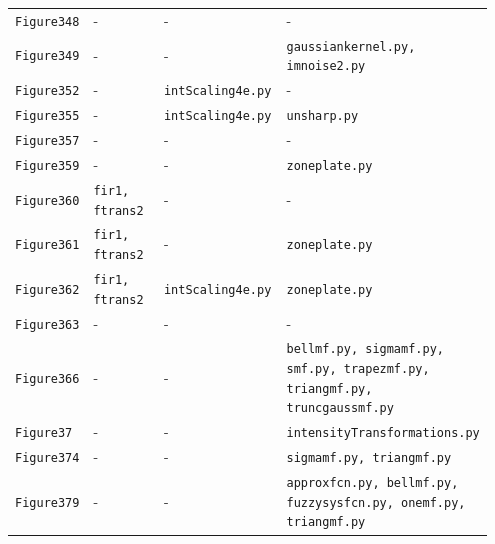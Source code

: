 \documentclass[10pt]{article}
\begin{document}
\begin{longtable}{p{0.11\linewidth} p{0.28\linewidth} p{0.28\linewidth} p{0.28\linewidth}}
\texttt{Figure348} & - & - & - \\
\texttt{Figure349} & - & - & \texttt{gaussiankernel.py, imnoise2.py} \\
\texttt{Figure352} & - & \texttt{intScaling4e.py} & - \\
\texttt{Figure355} & - & \texttt{intScaling4e.py} & \texttt{unsharp.py} \\
\texttt{Figure357} & - & - & - \\
\texttt{Figure359} & - & - & \texttt{zoneplate.py} \\
\texttt{Figure360} & \texttt{fir1, ftrans2} & - & - \\
\texttt{Figure361} & \texttt{fir1, ftrans2} & - & \texttt{zoneplate.py} \\
\texttt{Figure362} & \texttt{fir1, ftrans2} & \texttt{intScaling4e.py} & \texttt{zoneplate.py} \\
\texttt{Figure363} & - & - & - \\
\texttt{Figure366} & - & - & \texttt{bellmf.py, sigmamf.py, smf.py, trapezmf.py, triangmf.py, truncgaussmf.py} \\
\texttt{Figure37} & - & - & \texttt{intensityTransformations.py} \\
\texttt{Figure374} & - & - & \texttt{sigmamf.py, triangmf.py} \\
\texttt{Figure379} & - & - & \texttt{approxfcn.py, bellmf.py, fuzzysysfcn.py, onemf.py, triangmf.py} \\
\end{longtable}
\end{document}
